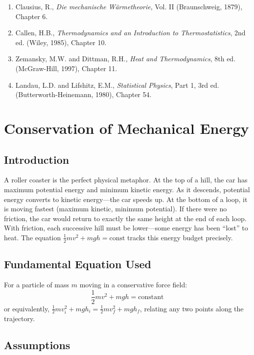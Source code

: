\documentclass[11pt,openright]{book}
\begin{document}
\begin{enumerate}
\item Clausius, R., \textit{Die mechanische W\"armetheorie}, Vol. II (Braunschweig, 1879), Chapter 6.
\item Callen, H.B., \textit{Thermodynamics and an Introduction to Thermostatistics}, 2nd ed. (Wiley, 1985), Chapter 10.
\item Zemansky, M.W. and Dittman, R.H., \textit{Heat and Thermodynamics}, 8th ed. (McGraw-Hill, 1997), Chapter 11.
\item Landau, L.D. and Lifshitz, E.M., \textit{Statistical Physics}, Part 1, 3rd ed. (Butterworth-Heinemann, 1980), Chapter 54.
\end{enumerate}


\chapter{Conservation of Mechanical Energy}

\section*{Introduction}

A roller coaster is the perfect physical metaphor. At the top of a hill, the car has maximum potential energy and minimum kinetic energy. As it descends, potential energy converts to kinetic energy---the car speeds up. At the bottom of a loop, it is moving fastest (maximum kinetic, minimum potential). If there were no friction, the car would return to exactly the same height at the end of each loop. With friction, each successive hill must be lower---some energy has been ``lost'' to heat. The equation $\frac{1}{2}mv^2 + mgh = \text{const}$ tracks this energy budget precisely.
\section*{Fundamental Equation Used}

For a particle of mass $m$ moving in a conservative force field:
\[
\frac{1}{2}mv^2 + mgh = \text{constant}
\]
or equivalently, $\frac{1}{2}mv_i^2 + mgh_i = \frac{1}{2}mv_f^2 + mgh_f$, relating any two points along the trajectory.
\section*{Assumptions}
\end{document}
